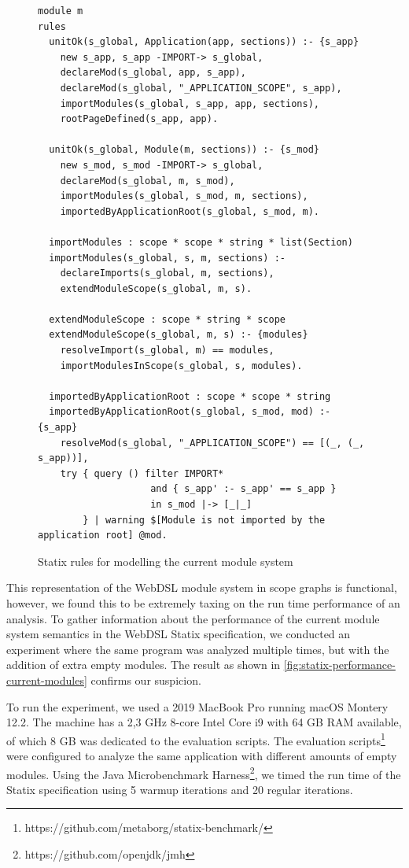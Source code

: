     \begin{figure}
      \begin{verbatim}
module m
rules
  unitOk(s_global, Application(app, sections)) :- {s_app}
    new s_app, s_app -IMPORT-> s_global,
    declareMod(s_global, app, s_app),
    declareMod(s_global, "_APPLICATION_SCOPE", s_app),
    importModules(s_global, s_app, app, sections),
    rootPageDefined(s_app, app).

  unitOk(s_global, Module(m, sections)) :- {s_mod}
    new s_mod, s_mod -IMPORT-> s_global,
    declareMod(s_global, m, s_mod),
    importModules(s_global, s_mod, m, sections),
    importedByApplicationRoot(s_global, s_mod, m).

  importModules : scope * scope * string * list(Section)
  importModules(s_global, s, m, sections) :-
    declareImports(s_global, m, sections),
    extendModuleScope(s_global, m, s).

  extendModuleScope : scope * string * scope
  extendModuleScope(s_global, m, s) :- {modules}
    resolveImport(s_global, m) == modules,
    importModulesInScope(s_global, s, modules).

  importedByApplicationRoot : scope * scope * string
  importedByApplicationRoot(s_global, s_mod, mod) :- {s_app}
    resolveMod(s_global, "_APPLICATION_SCOPE") == [(_, (_, s_app))],
    try { query () filter IMPORT*
                    and { s_app' :- s_app' == s_app }
                    in s_mod |-> [_|_]
        } | warning $[Module is not imported by the application root] @mod.
      \end{verbatim}
      \caption{\label{fig:current-module-system-statix}Statix rules for modelling the current module system}
    \end{figure}

    This representation of the WebDSL module system in scope graphs is functional, however, we found this to be extremely taxing on the run time performance of an analysis. To gather information about the performance of the current module system semantics in the WebDSL Statix specification, we conducted an experiment where the same program was analyzed multiple times, but with the addition of extra empty modules. The result as shown in \cref{fig:statix-performance-current-modules} confirms our suspicion.

    To run the experiment, we used a 2019 MacBook Pro running macOS Montery 12.2. The machine has a 2,3 GHz 8-core Intel Core i9 with 64 GB RAM available, of which 8 GB was dedicated to the evaluation scripts. The evaluation scripts\footnote{https://github.com/metaborg/statix-benchmark/} were configured to analyze the same application with different amounts of empty modules. Using the Java Microbenchmark Harness\footnote{https://github.com/openjdk/jmh}, we timed the run time of the Statix specification using 5 warmup iterations and 20 regular iterations.

